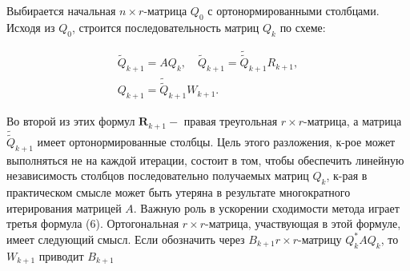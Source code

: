 \documentclass[10pt]{article}
\begin{document}
Выбирается начальная $n \times r$-матрица $Q_{0}$ с ортонормированными столбцами. Исходя из $Q_{0}$, строится последовательность матриц $Q_{k}$ по схеме:



\[

\begin{gathered}

\tilde{Q}_{k+1}=A Q_{k}, \quad \tilde{Q}_{k+1}=\tilde{\tilde{Q}}_{k+1} R_{k+1}, \\

Q_{k+1}=\tilde{\tilde{Q}}_{k+1} W_{k+1} .

\end{gathered}

\]



Во второй из этих формул $\boldsymbol{R}_{k+1}-$ правая треугольная $r \times r$-матрица, а матрица $\tilde{\tilde{Q}}_{k+1}$ имеет ортонормированные столбцы. Цель этого разложения, к-рое может выполняться не на каждой итерации, состоит в том, чтобы обеспечить линейную независимость столбцов последовательно получаемых матриц $Q_{k}$, к-рая в практическом смысле может быть утеряна в результате многократного итерирования матрицей $A$. Важную роль в ускорении сходимости метода играет третья формула (6). Ортогональная $r \times r$-матрица, участвующая в этой формуле, имеет следующий смысл. Если обозначить через $B_{k+1} r \times r$-матрицу $Q_{k}^{*} A Q_{k}$, то $W_{k+1}$ приводит $B_{k+1}$
\end{document}
